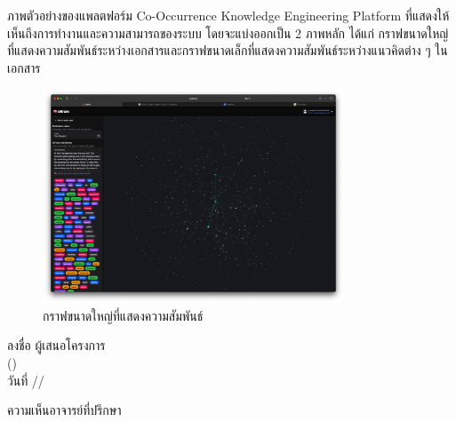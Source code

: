 \documentclass[12pt,a4paper]{article}
\newcommand{\textlight}[1]{{\thailightfont #1}}
\newcommand{\dotrule}[1]{\hdashrule{#1}{0.6pt}{1pt}}
\begin{document}
\begin{enumerate}[leftmargin=2cm]
    \vspace{1cm}

    \textlight{
        ภาพตัวอย่างของแพลตฟอร์ม Co-Occurrence Knowledge Engineering Platform ที่แสดงให้เห็นถึงการทำงานและความสามารถของระบบ โดยจะแบ่งออกเป็น 2 ภาพหลัก ได้แก่ กราฟขนาดใหญ่ที่แสดงความสัมพันธ์ระหว่างเอกสารและกราฟขนาดเล็กที่แสดงความสัมพันธ์ระหว่างแนวคิดต่าง ๆ ในเอกสาร
    }

    \begin{figure}[H]
        \centering
        \includegraphics[width=0.8\textwidth]{images/platform_1.png}
        \caption{กราฟขนาดใหญ่ที่แสดงความสัมพันธ์}
        \label{fig:platform_1}
    \end{figure}

\end{enumerate}

\vspace{5cm}

\hfill\begin{minipage}{10cm}
    \vspace{0.5cm}
    \begin{center}
        \textlight{ลงชื่อ \dotrule{150pt} ผู้เสนอโครงการ}\\[0.2cm]
        \textlight{(\dotrule{180pt})}\\[0.4cm]
        \textlight{วันที่ \dotrule{50pt}/\dotrule{50pt}/\dotrule{50pt}}
    \end{center}
    \vspace{0.5cm}
\end{minipage}         

\vspace{0.5cm}

\textlight{ความเห็นอาจารย์ที่ปรึกษา}
\dotrule{378pt}

\dotrule{500pt}

\dotrule{500pt}
\end{document}
